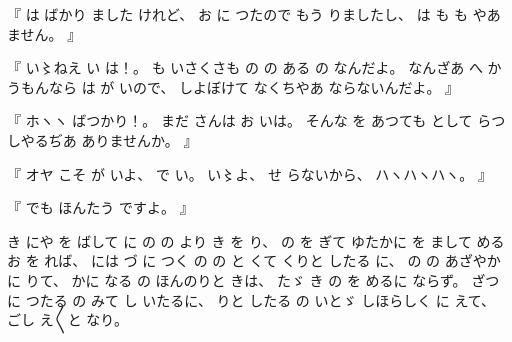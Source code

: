 %
『
は
ばかり
ました
けれど、
%
お
に
つたので
もう
りましたし、
%
は
も
も
やあ
ません。
』

%
『
い〻ねえ%
い
は！。
%
も
いさくさも
の
の
ある
の
なんだよ。
%
なんざあ
へ%
かうもんなら
は
が
いので、
%
しよぼけて
なくちやあ
ならないんだよ。
』

%
『
ホヽヽ
ばつかり！。
%
まだ
さんは
お
いは。
%
そんな
を
あつても
として
らつしやるぢあ
ありませんか。
』

%
『
オヤ
こそ
が
いよ、
%
で
い。
%
い〻よ、%
%
せ
らないから、
%
ハヽハヽハヽ。
』

%
『
でも
ほんたう
ですよ。
』

%
き%
にや
を
ばして
に
の
の
より
き
を
り、
%
の
を
ぎて
ゆたかに
を
まして
める
お
を
れば、
%
には
づ
に
つく
の
の
と
くて
くりと
したる
に、
%
の
の
あざやかに
りて、
%
かに
なる
の
ほんのりと
きは、
%
たゞ%
き
の
を
めるに%
ならず。
%
ざつに
つたる
の
みて
し
いたるに、
%
りと
したる
の
いとゞ%
しほらしく
に
えて、
%
ごし
え〳〵と
なり。%

